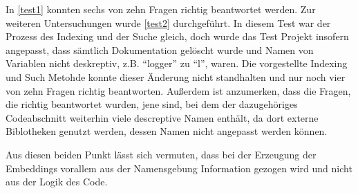 \documentclass[../main.tex]{subfiles}
\begin{document}
In \ref{test1} konnten sechs von zehn Fragen richtig beantwortet werden.
Zur weiteren Untersuchungen wurde \ref{test2} durchgeführt.
In diesem Test war der Prozess des Indexing und der Suche gleich, doch wurde das Test Projekt insofern angepasst, dass sämtlich Dokumentation gelöscht wurde und Namen von Variablen nicht deskreptiv, z.B. \enquote{logger} zu \enquote{l}, waren.
Die vorgestellte Indexing und Such Metohde konnte dieser Änderung nicht standhalten und nur noch vier von zehn Fragen richtig beantworten.
Außerdem ist anzumerken, dass die Fragen, die richtig beantwortet wurden, jene sind, bei dem der dazugehöriges Codeabschnitt weiterhin viele descreptive Namen enthält, da dort externe Biblotheken genutzt werden, dessen Namen nicht angepasst werden können.


Aus diesen beiden Punkt lässt sich vermuten, dass bei der Erzeugung der Embeddings vorallem aus der Namensgebung Information gezogen wird und nicht aus der Logik des Code.
\end{document}
